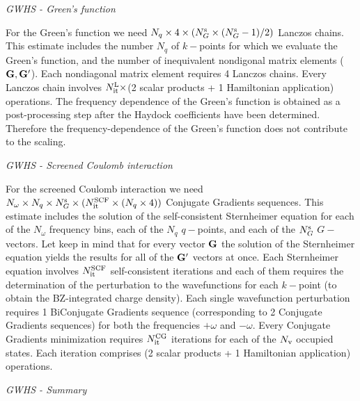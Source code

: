 \documentclass[12pt]{article}
\def\G{{\bf G}}
\def\Gp{{\bf G}^\prime}
\begin{document}
\noindent
{\it GWHS - Green's function} 

\noindent
For the Green's function we need $N_q \times 4 \times (N_G^{\rm s} \times 
(N_G^{\rm s} -1 )/2)$ Lanczos chains. This estimate includes the number $N_q$ of $k-$points for which we evaluate
the Green's function, and the number of inequivalent
nondigonal matrix elements ($\G,\Gp$). Each nondiagonal matrix element requires 4 Lanczos chains.
Every Lanczos chain involves $N_{\rm it}^{\rm L}\times $(2 scalar products +
1 Hamiltonian application) operations. The frequency dependence of the
Green's function is obtained as a post-processing step after the
Haydock coefficients have been determined. Therefore the frequency-dependence
of the Green's function does not contribute to the scaling.

\noindent
{\it GWHS - Screened Coulomb interaction} 

\noindent
For the screened Coulomb interaction we need 
$N_\omega \times N_q \times N_G^{\rm s} \times (N_{\rm it}^{\rm SCF}\times(N_q \times 4 ))$
Conjugate Gradients sequences. This estimate includes the solution of the self-consistent
Sternheimer equation for each of the $N_\omega$ frequency bins, each of the $N_q$ $q-$points, and each
of the $N_G^{\rm s}$ $G-$vectors. Let keep in mind that for every vector $\G$ the solution
of the Sternheimer equation yields the results for all of the $\Gp$ vectors at once.
Each Sternheimer equation involves $N_{\rm it}^{\rm SCF}$ self-consistent iterations
and each of them requires the determination of the perturbation to the wavefunctions
for each $k-$point (to obtain the BZ-integrated charge density). Each single wavefunction
perturbation requires 1 BiConjugate Gradients sequence (corresponding to 2 Conjugate Gradients
sequences) for both the frequencies $+\omega$ and $-\omega$.
Every Conjugate Gradients minimization requires $N_{\rm it}^{\rm CG}$ iterations for each
of the $N_{\rm v}$ occupied states. Each iteration comprises (2 scalar products +
1 Hamiltonian application) operations.

\noindent
{\it GWHS - Summary} 
\end{document}
